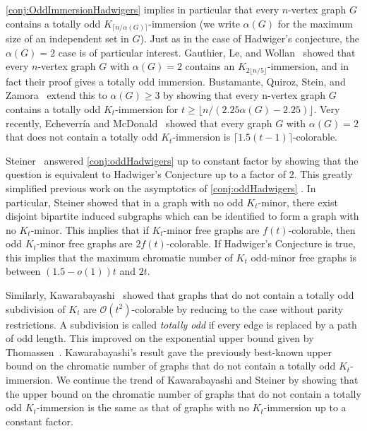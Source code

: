 \documentclass{article}
\theoremstyle{definition}
\begin{document}
\cref{conj:OddImmersionHadwigers} implies in particular that every $n$-vertex graph $G$ contains a totally odd $K_{\lceil n/\alpha(G)\rceil}$-immersion (we write $\alpha(G)$ for the maximum size of an independent set in $G$). Just as in the case of Hadwiger's conjecture, the $\alpha(G) = 2$ case is of particular interest. Gauthier, Le, and Wollan~\cite{Gauthier2019Forcing} showed that every $n$-vertex graph $G$ with $\alpha(G) = 2$ contains an $K_{2\lfloor n/5\rfloor}$-immersion, and in fact their proof gives a totally odd immersion. Bustamante, Quiroz, Stein, and Zamora~\cite{bustamante2022clique} extend this to $\alpha(G) \geq 3$ by showing that every n-vertex graph $G$ contains a totally odd $K_t$-immersion for $t \geq \lfloor n/(2.25\alpha(G) - 2.25)\rfloor$. Very recently, Echeverr\'{i}a and McDonald~\cite{echeverria2026coloring} showed that every graph $G$ with $\alpha(G) = 2$ that does not contain a totally odd $K_t$-immersion is $\lceil 1.5(t-1)\rceil$-colorable.

Steiner~\cite{Steiner2022Asymptotic} answered \cref{conj:oddHadwigers} up to constant factor by showing that the question is equivalent to Hadwiger's Conjecture up to a factor of 2. This greatly simplified previous work on the asymptotics of \cref{conj:oddHadwigers} \cite{delcourt2025reducing, Geelen2009oddMinor, kawarabayashi2009note, norin2022new, postle2020further}. In particular, Steiner showed that in a graph with no odd $K_t$-minor, there exist disjoint bipartite induced subgraphs which can be identified to form a graph with no $K_t$-minor. This implies that if $K_t$-minor free graphs are $f(t)$-colorable, then odd $K_t$-minor free graphs are $2f(t)$-colorable. If Hadwiger's Conjecture is true, this implies that the maximum chromatic number of $K_t$ odd-minor free graphs is between $(1.5 - o(1))t$ and $2t$.

Similarly, Kawarabayashi~\cite{Kawarabayashi2013Totally} showed that graphs that do not contain a totally odd subdivision of $K_t$ are $\mathcal{O}(t^2)$-colorable by reducing to the case without parity restrictions. A subdivision is called \emph{totally odd} if every edge is replaced by a path of odd length. This improved on the exponential upper bound given by Thomassen~\cite{thomassen1983graph}. Kawarabayashi's result gave the previously best-known upper bound on the chromatic number of graphs that do not contain a totally odd $K_t$-immersion. We continue the trend of Kawarabayashi and Steiner by showing that the upper bound on the chromatic number of graphs that do not contain a totally odd $K_t$-immersion is the same as that of graphs with no $K_t$-immersion up to a constant factor.
\end{document}
